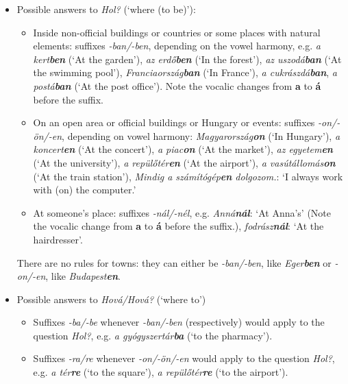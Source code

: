 \documentclass[a4paper,11pt]{article}
\begin{document}
\begin{itemize}
  \item Possible answers to \emph{Hol?} (`where (to be)'):
    \begin{itemize}

      \item Inside non-official buildings or countries or some places
        with natural elements: suffixes \emph{-ban/-ben}, depending on
        the vowel harmony, e.g. \emph{a kert\textbf{ben}} (`At the
        garden'), \emph{az erdő\textbf{ben}} (`In the forest'),
        \emph{az uszodá\textbf{ban}} (`At the swimming pool'),
        \emph{Franciaország\textbf{ban}} (`In France'), \emph{a
        cukrászdá\textbf{ban}}, \emph{a postá\textbf{ban}} (`At the
        post office'). Note the vocalic changes from \textbf{a} to
        \textbf{á} before the suffix.

      \item On an open area or official buildings or Hungary or
        events: suffixes \emph{-on/-ön/-en}, depending on vowel
        harmony: \emph{Magyarország\textbf{on}} (`In Hungary'),
        \emph{a koncert\textbf{en}} (`At the concert'), \emph{a
        piac\textbf{on}} (`At the market'), \emph{az
        egyetem\textbf{en}} (`At the university'), \emph{a
        repülőtér\textbf{en}} (`At the airport'), \emph{a
        vas\-út\-állomás\textbf{on}} (`At the train station'),
        \emph{Mindig a számítógép\textbf{en} dolgozom.}: `I always
        work with (on) the computer.'

      \item At someone's place: suffixes \emph{-nál/-nél},
        e.g. \emph{Anná\textbf{nál}}: `At Anna's' (Note the vocalic
        change from \textbf{a} to \textbf{á} before the suffix.),
        \emph{fodrász\textbf{nál}}: `At the hairdresser'.

    \end{itemize}
    There are no rules for towns: they can either be \emph{-ban/-ben},
    like \emph{Eger\textbf{ben}} or \emph{-on/-en}, like
    \emph{Budapest\textbf{en}}.

  \item Possible answers to \emph{Hová/Hová?} (`where to')
    \begin{itemize}

      \item Suffixes \emph{-ba/-be} whenever \emph{-ban/-ben}
        (respectively) would apply to the question \emph{Hol?},
        e.g. \emph{a gyógyszertár\textbf{ba}} (`to the pharmacy').

      \item Suffixes \emph{-ra/re} whenever \emph{-on/-ön/-en} would
        apply to the question \emph{Hol?}, e.g. \emph{a
        tér\textbf{re}} (`to the square'), \emph{a
        repülőtér\textbf{re}} (`to the airport').


\end{itemize}
\end{itemize}
\end{document}
